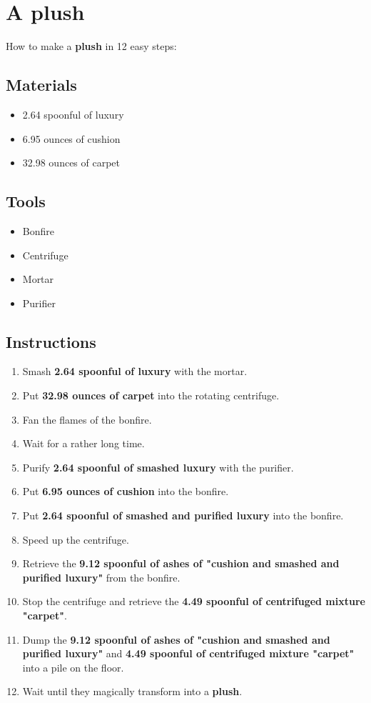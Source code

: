 \documentclass{article}
\begin{document}
\section{A plush}How to make a \textbf{plush} in 12 easy steps:

\subsection{Materials}\begin{itemize}
\item 
2.64 spoonful of luxury
\item 
6.95 ounces of cushion
\item 
32.98 ounces of carpet
\end{itemize}
\subsection{Tools}\begin{itemize}
\item 
Bonfire
\item 
Centrifuge
\item 
Mortar
\item 
Purifier
\end{itemize}
\subsection{Instructions}\begin{enumerate}
\item 
Smash \textbf{2.64 spoonful of luxury} with the mortar.
\item 
Put \textbf{32.98 ounces of carpet} into the rotating centrifuge.
\item 
Fan the flames of the bonfire.
\item 
Wait for a rather long time.
\item 
Purify \textbf{2.64 spoonful of smashed luxury} with the purifier.
\item 
Put \textbf{6.95 ounces of cushion} into the bonfire.
\item 
Put \textbf{2.64 spoonful of smashed and purified luxury} into the bonfire.
\item 
Speed up the centrifuge.
\item 
Retrieve the \textbf{9.12 spoonful of ashes of "cushion and smashed and purified luxury"} from the bonfire.
\item 
Stop the centrifuge and retrieve the \textbf{4.49 spoonful of centrifuged mixture "carpet"}.
\item 
Dump the \textbf{9.12 spoonful of ashes of "cushion and smashed and purified luxury"} and \textbf{4.49 spoonful of centrifuged mixture "carpet"} into a pile on the floor.
\item 
Wait until they magically transform into a \textbf{plush}.
\end{enumerate}
\newpage
\end{document}

